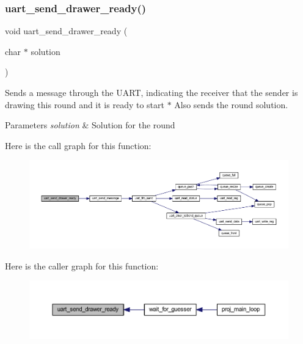 \subsubsection{\texorpdfstring{uart\+\_\+send\+\_\+drawer\+\_\+ready()}{uart\_send\_drawer\_ready()}}
{\footnotesize\ttfamily void uart\+\_\+send\+\_\+drawer\+\_\+ready (\begin{DoxyParamCaption}\item[{char $\ast$}]{solution }\end{DoxyParamCaption})}



Sends a message through the U\+A\+RT, indicating the receiver that the sender is drawing this round and it is ready to start $\ast$ Also sends the round solution. 


\begin{DoxyParams}{Parameters}
{\em solution} & Solution for the round \\
\hline
\end{DoxyParams}
Here is the call graph for this function\+:\nopagebreak
\begin{figure}[H]
\begin{center}
\leavevmode
\includegraphics[width=350pt]{group__uart__wordgame_ga84ae87284e5c2263f8d7c85b560f915a_cgraph}
\end{center}
\end{figure}
Here is the caller graph for this function\+:\nopagebreak
\begin{figure}[H]
\begin{center}
\leavevmode
\includegraphics[width=350pt]{group__uart__wordgame_ga84ae87284e5c2263f8d7c85b560f915a_icgraph}
\end{center}
\end{figure}
\mbox{\label{group__uart__wordgame_ga5cc4c7bd39ce863e14dde99a5f22f0e4}} 
